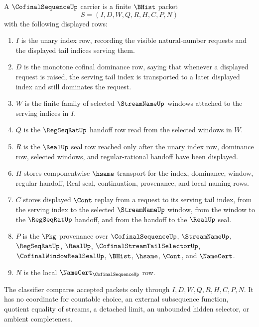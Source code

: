 \begin{definition}\label{def:cofinal-sequence-carrier}
A $\CofinalSequenceUp$ carrier is a finite $\BHist$ packet
$$
S=(I,D,W,Q,R,H,C,P,N)
$$
with the following displayed rows:
\begin{enumerate}
\item $I$ is the unary index row, recording the visible natural-number requests and the displayed tail indices serving them.
\item $D$ is the monotone cofinal dominance row, saying that whenever a displayed request is raised, the serving tail index is transported to a later displayed index and still dominates the request.
\item $W$ is the finite family of selected $\StreamNameUp$ windows attached to the serving indices in $I$.
\item $Q$ is the $\RegSeqRatUp$ handoff row read from the selected windows in $W$.
\item $R$ is the $\RealUp$ seal row reached only after the unary index row, dominance row, selected windows, and regular-rational handoff have been displayed.
\item $H$ stores componentwise $\hsame$ transport for the index, dominance, window, regular handoff, Real seal, continuation, provenance, and local naming rows.
\item $C$ stores displayed $\Cont$ replay from a request to its serving tail index, from the serving index to the selected $\StreamNameUp$ window, from the window to the $\RegSeqRatUp$ handoff, and from the handoff to the $\RealUp$ seal.
\item $P$ is the $\Pkg$ provenance over $\CofinalSequenceUp$, $\StreamNameUp$, $\RegSeqRatUp$, $\RealUp$, $\CofinalStreamTailSelectorUp$, $\CofinalWindowRealSealUp$, $\BHist$, $\hsame$, $\Cont$, and $\NameCert$.
\item $N$ is the local $\NameCert_{\CofinalSequenceUp}$ row.
\end{enumerate}
The classifier compares accepted packets only through $I,D,W,Q,R,H,C,P,N$. It has no coordinate for countable choice, an external subsequence function, quotient equality of streams, a detached limit, an unbounded hidden selector, or ambient completeness.
\end{definition}

